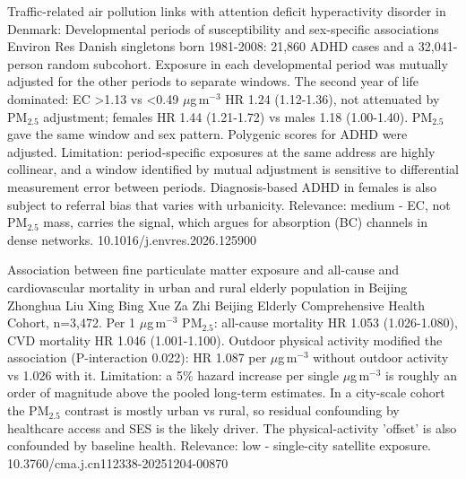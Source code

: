 \documentclass[10pt]{article}
\begin{document}

{Traffic-related air pollution links with attention deficit hyperactivity disorder in Denmark: Developmental periods of susceptibility and sex-specific associations}
{Environ Res}
{Danish singletons born 1981-2008: 21,860 ADHD cases and a 32,041-person random subcohort. Exposure in each developmental period was mutually adjusted for the other periods to separate windows. The second year of life dominated: EC >1.13 vs <0.49 $\mu$g\,m$^{-3}$ HR 1.24 (1.12-1.36), not attenuated by PM$_{2.5}$ adjustment; females HR 1.44 (1.21-1.72) vs males 1.18 (1.00-1.40). PM$_{2.5}$ gave the same window and sex pattern. Polygenic scores for ADHD were adjusted. Limitation: period-specific exposures at the same address are highly collinear, and a window identified by mutual adjustment is sensitive to differential measurement error between periods. Diagnosis-based ADHD in females is also subject to referral bias that varies with urbanicity. Relevance: medium - EC, not PM$_{2.5}$ mass, carries the signal, which argues for absorption (BC) channels in dense networks.}
{10.1016/j.envres.2026.125900}

\par{}\baselineskip{}\baselineskip
{}

{Association between fine particulate matter exposure and all-cause and cardiovascular mortality in urban and rural elderly population in Beijing}
{Zhonghua Liu Xing Bing Xue Za Zhi}
{Beijing Elderly Comprehensive Health Cohort, n=3,472. Per 1 $\mu$g\,m$^{-3}$ PM$_{2.5}$: all-cause mortality HR 1.053 (1.026-1.080), CVD mortality HR 1.046 (1.001-1.100). Outdoor physical activity modified the association (P-interaction 0.022): HR 1.087 per $\mu$g\,m$^{-3}$ without outdoor activity vs 1.026 with it. Limitation: a 5\% hazard increase per single $\mu$g\,m$^{-3}$ is roughly an order of magnitude above the pooled long-term estimates. In a city-scale cohort the PM$_{2.5}$ contrast is mostly urban vs rural, so residual confounding by healthcare access and SES is the likely driver. The physical-activity 'offset' is also confounded by baseline health. Relevance: low - single-city satellite exposure.}
{10.3760/cma.j.cn112338-20251204-00870}
\end{document}
